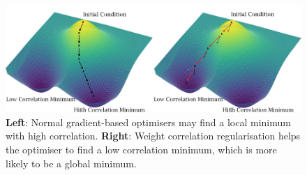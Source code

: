 \begin{figure}[t!]
\includegraphics[width=1
\textwidth]{images/PAC-Bayes/figure2_2.jpg}
\centering
\caption{\textbf{Left}: Normal gradient-based optimisers may find a local minimum with high correlation.  \textbf{Right}: Weight correlation regularisation helps the optimiser to find a low correlation minimum, which is more likely to be a global minimum.}    
\vspace{-4mm}
\label{fig2}
\end{figure}
